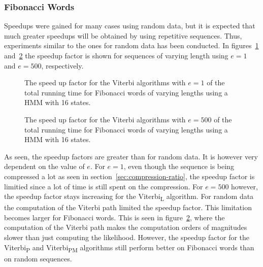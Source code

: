 \subsubsection{Fibonacci Words}

Speedups were gained for many cases using random data, but it is
expected that much greater speedups will be obtained by using repetitive
sequences. Thus, experiments similar to the ones for random data has been
conducted. In figures~\ref{fig:fib_compressed_1_speedup_vs_sequence_length}
and~\ref{fig:fib_compressed_500_speedup_vs_sequence_length} the speedup factor
is shown for sequences of varying length using $e = 1$ and $e = 500$, respectively.

\begin{figure}
  \centering
  
  \caption{The speed up factor for the Viterbi algorithms with $e = 1$ of the total
    running time for Fibonacci words of varying
    lengths using a HMM with 16 states.}
  \label{fig:fib_compressed_1_speedup_vs_sequence_length}
\end{figure}

\begin{figure}
  \centering
  
  \caption{The speed up factor for the Viterbi algorithms with $e = 500$ of the total
    running time for Fibonacci words of varying
    lengths using a HMM with 16 states.}
  \label{fig:fib_compressed_500_speedup_vs_sequence_length}
\end{figure}

As seen, the speedup factors are greater than for random data. It is however
very dependent on the value of $e$. For $e = 1$, even though the sequence is
being compressed a lot as seen in section~\ref{sec:compression-ratio}, the
speedup factor is limitied since a lot of time is still spent on the
compression. For $e = 500$ however, the speedup factor stays increasing for the
Viterbi\textsubscript{L} algorithm. For random data the computation of the
Viterbi path limited the speedup factor. This limitation becomes larger for
Fibonacci words. This is seen in
figure~\ref{fig:fib_compressed_500_speedup_vs_sequence_length}, where the
computation of the Viterbi path makes the computation orders of magnitudes
slower than just computing the likelihood. However, the speedup factor for the
Viterbi\textsubscript{P} and Viterbi\textsubscript{PM} algorithms still perform
better on Fibonacci words than on random sequences.

